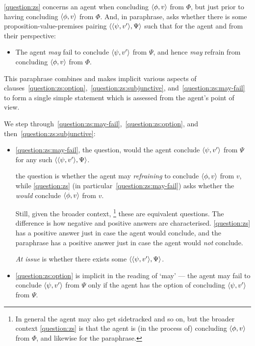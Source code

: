 \begin{note}
  \autoref{question:zs} concerns an agent when concluding \(\langle \phi, v \rangle\) from \(\Phi\), but just prior to having concluding \(\langle \phi, v \rangle\) from \(\Phi\).
  And, in paraphrase, asks whether there is some proposition-value-premises pairing \(\langle \langle \psi, v' \rangle, \Psi \rangle\) such that for the agent and from their perspective:
  \begin{itemize}
  \item
    The agent \emph{may} fail to conclude \(\langle \psi, v' \rangle\) from \(\Psi\), and hence \emph{may} refrain from concluding \(\langle \phi, v \rangle\) from \(\Phi\).
  \end{itemize}

  This paraphrase combines and makes implicit various aspects of clauses~\ref{question:zs:option},~\ref{question:zs:subjunctive}, and~\ref{question:zs:may-fail} to form a single simple statement which is assessed from the agent's point of view.

  We step through~\ref{question:zs:may-fail},~\ref{question:zs:option}, and then~\ref{question:zs:subjunctive}:

  \begin{itemize}
  \item
    \ref{question:zs:may-fail}, the question, would the agent conclude \(\langle \psi, v' \rangle\) from \(\Psi\) for any such \(\langle \langle \psi, v' \rangle, \Psi \rangle\).

    the question is whether the agent may \emph{refraining} to conclude \(\langle \phi, v \rangle\) from \(v\), while \autoref{question:zs} (in particular~\ref{question:zs:may-fail}) asks whether the \emph{would} conclude \(\langle \phi, v \rangle\) from \(v\).

  Still, given the broader context,%
  \footnote{
    In general the agent may also get sidetracked and so on, but the broader context \autoref{question:zs} is that the agent is (in the process of) concluding \(\langle \phi, v \rangle\) from \(\Phi\), and likewise for the paraphrase.
  }
  these are equivalent questions.
  The difference is how negative and positive answers are characterised.
  \autoref{question:zs} has a positive answer just in case the agent would conclude, and the paraphrase has a positive answer just in case the agent would \emph{not} conclude.

  \emph{At issue} is whether there exists some \(\langle \langle \psi, v' \rangle, \Psi \rangle\).
\item
    \ref{question:zs:option} is implicit in the reading of `may' --- the agent may fail to conclude \(\langle \psi, v' \rangle\) from \(\Psi\) only if the agent has the option of concluding \(\langle \psi, v' \rangle\) from \(\Psi\).


\end{itemize}
\end{note}
